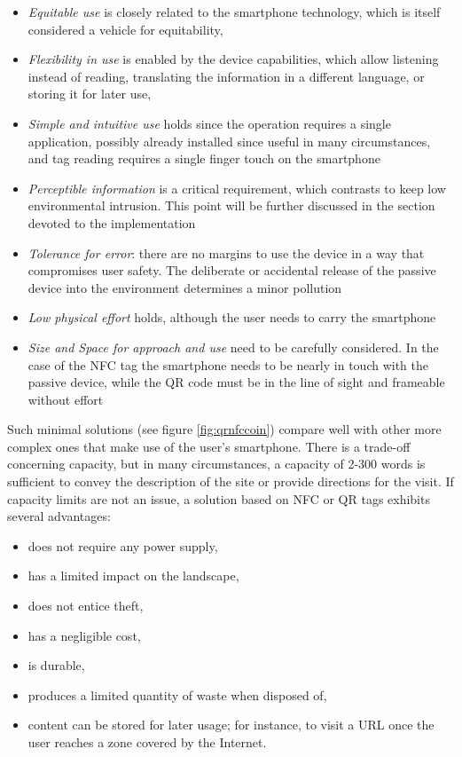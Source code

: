 \documentclass[sustainability,article,submit,pdftex,moreauthors]{Definitions/mdpi}
\begin{document}
\begin{itemize}
	\item {\em Equitable use} is closely related to the smartphone technology, which is itself considered a vehicle for equitability,
	\item {\em Flexibility in use} is enabled by the device capabilities, which allow listening instead of reading, translating the information in a different language, or storing it for later use,
	\item {\em Simple and intuitive use} holds since the operation requires a single application, possibly already installed since useful in many circumstances, and tag reading requires a single finger touch on the smartphone
	\item{\em Perceptible information} is a critical requirement, which contrasts to keep low environmental intrusion. This point will be further discussed in the section devoted to the implementation
	\item{\em Tolerance for error}: there are no margins to use the device in a way that compromises user safety. The deliberate or accidental release of the passive device into the environment determines a minor pollution
	\item{\em Low physical effort} holds, although the user needs to carry the smartphone
	\item{\em Size and Space for approach and use} need to be carefully considered. In the case of the NFC tag the smartphone needs to be nearly in touch with the passive device, while the QR code must be in the line of sight and frameable without effort
\end{itemize}

Such minimal solutions (see figure \ref{fig:qrnfccoin}) compare well with other more complex ones that make use of the user's smartphone. There is a trade-off concerning capacity, but in many circumstances, a capacity of 2-300 words is sufficient to convey the description of the site or provide directions for the visit. If capacity limits are not an issue, a solution based on NFC or QR tags exhibits several advantages:

\begin{itemize} 
\item does not require any power supply,
\item has a limited impact on the landscape,
\item does not entice theft,
\item has a negligible cost,
\item is durable,
\item produces a limited quantity of waste when disposed of,
\item content can be stored for later usage; for instance, to visit a URL once the user reaches a zone covered by the Internet.
\end{itemize}
\end{document}
